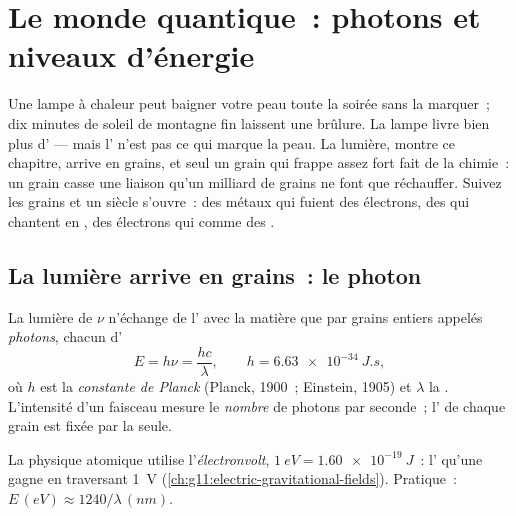 \chapter{Le monde quantique~: photons et niveaux d'énergie}\label{ch:g12:quantum-world}

Une lampe à chaleur  peut baigner votre peau
toute la soirée sans la marquer~; dix minutes de soleil de montagne
fin laissent une brûlure. La lampe livre bien plus
d' --- mais l' n'est
pas ce qui marque la peau. La lumière, montre ce chapitre, arrive en
grains, et seul un grain qui frappe assez fort fait de la chimie~: un
grain  casse une liaison qu'un milliard de
grains  ne font que réchauffer. Suivez les
grains et un siècle s'ouvre~: des métaux qui fuient des électrons, des
 qui chantent en
, des électrons qui  comme
des .

\section{La lumière arrive en grains~: le photon}

\begin{definition}[Le photon]\label{def:g12:quantum-world:photon}
La lumière de  $\nu$ n'échange de
l' avec la matière que par grains entiers
appelés \emph{photons}, chacun d'
\[
E = h\nu = \frac{hc}{\lambda}, \qquad h = \qty{6.63e-34}{J.s},
\]
où $h$ est la \emph{constante de Planck}
(Planck, 1900~; Einstein, 1905) et $\lambda$ la
. L'intensité d'un
faisceau mesure le \emph{nombre} de photons par seconde~;
l' de chaque grain est fixée par la
 seule.
\end{definition}

\begin{notation}[L'électronvolt]\label{not:g12:quantum-world:ev}
La physique atomique utilise l'\emph{électronvolt},
$\qty{1}{eV} = \qty{1.60e-19}{J}$~: l' qu'une
 gagne en traversant
\qty{1}{V} (\cref{ch:g11:electric-gravitational-fields}). Pratique~:
$E \,(\unit{eV}) \approx 1240/\lambda\,(\unit{nm})$.
\end{notation}

